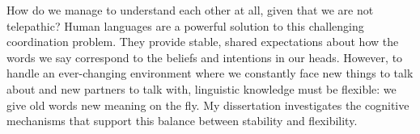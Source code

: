 
How do we manage to understand each other at all, given that we are not telepathic? 
Human languages are a powerful solution to this challenging coordination problem.
They provide stable, shared expectations about how the words we say correspond to the beliefs and intentions in our heads.
However, to handle an ever-changing environment where we constantly face new things to talk about and new partners to talk with, linguistic knowledge must be flexible: we give old words new meaning on the fly.
My dissertation investigates the cognitive mechanisms that support this balance between stability and flexibility. %
